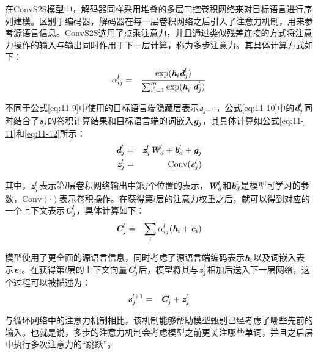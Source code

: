 \parinterval 在ConvS2S模型中，解码器同样采用堆叠的多层门控卷积网络来对目标语言进行序列建模。区别于编码器，解码器在每一层卷积网络之后引入了注意力机制，用来参考源语言信息。ConvS2S选用了点乘注意力，并且通过类似残差连接的方式将注意力操作的输入与输出同时作用于下一层计算，称为多步注意力。其具体计算方式如下：
\begin{eqnarray}
\alpha_{ij}^l &=& \frac{ \textrm{exp} (\textbf{\em h}_i \textbf{\em d}_{j}^l) }{\sum_{i^{'}=1}^m \textrm{exp} (\textbf{\em h}_{i^{'}} \textbf{\em d}_{j}^l )}
\label{eq:11-10}
\end{eqnarray}

\noindent 不同于公式\eqref{eq:11-9}中使用的目标语言端隐藏层表示$\textbf{\em s}_{j-1}$，公式\eqref{eq:11-10}中的$\textbf{\em d}_{j}^l$同时结合了$\textbf{\em s}_{j}$的卷积计算结果和目标语言端的词嵌入$\textbf{\em g}_j$，其具体计算如公式\eqref{eq:11-11}和\eqref{eq:11-12}所示：
\begin{eqnarray}
\textbf{\em d}_{j}^l &=& \textbf{\em z}_{j}^{l}  \textbf{\em W}_{d}^{l} + \textbf{\em b}_{d}^{l} + \textbf{\em g}_j \label{eq:11-11} \\
\textbf{\em z}_j^l &=& \textrm{Conv}(\textbf{\em s}_j^l) \label{eq:11-12}
\end{eqnarray}

\noindent 其中，$\textbf{\em z}_j^l$表示第$l$层卷积网络输出中第$j$个位置的表示，$\textbf{\em W}_{d}^{l}$和$\textbf{\em b}_{d}^{l}$是模型可学习的参数，$\textrm{Conv}(\cdot)$表示卷积操作。在获得第$l$层的注意力权重之后，就可以得到对应的一个上下文表示$\textbf{\em C}_j^l$，具体计算如下：
\begin{eqnarray}
\textbf{\em C}_j^l &=& \sum_i \alpha_{ij}^l (\textbf{\em h}_i + \textbf{\em e}_i)
\label{eq:11-13}
\end{eqnarray}

\noindent 模型使用了更全面的源语言信息，同时考虑了源语言端编码表示$\textbf{\em h}_i$以及词嵌入表示$\textbf{\em e}_i$。在获得第$l$层的上下文向量$\textbf{\em C}_j^l$后，模型将其与$\textbf{\em z}_j^l$相加后送入下一层网络，这个过程可以被描述为：
\begin{eqnarray}
\textbf{\em s}_j^{l+1} &=& \textbf{\em C}_j^l + \textbf{\em z}_j^l
\label{eq:11-14}
\end{eqnarray}

\noindent 与循环网络中的注意力机制相比，该机制能够帮助模型甄别已经考虑了哪些先前的输入。也就是说，多步的注意力机制会考虑模型之前更关注哪些单词，并且之后层中执行多次注意力的“跳跃”。


